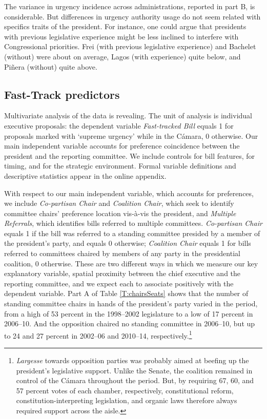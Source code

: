 \documentclass[letter,12pt]{article}
\begin{document}
The variance in urgency incidence across administrations, reported in part B, is considerable. But differences in urgency authority usage do not seem related with specifics traits of the president. For instance, one could argue that presidents with previous legislative experience might be less inclined to interfere with Congressional priorities. Frei (with previous legislative experience) and Bachelet (without) were about on average, Lagos (with experience) quite below, and Pi\~nera (without) quite above.

\subsection*{Fast-Track predictors}

Multivariate analysis of the data is revealing. The unit of analysis is individual executive proposals: the dependent variable \emph{Fast-tracked Bill} equals 1 for proposals marked with `supreme urgency' while in the C\'amara, 0 otherwise. Our main independent variable accounts for preference coincidence between the president and the reporting committee. We include controls for bill features, for timing, and for the strategic environment. Formal variable definitions and descriptive statistics appear in the online appendix.

With respect to our main independent variable, which accounts for preferences, we include \emph{Co-partisan Chair} and \emph{Coalition Chair}, which seek to identify committee chairs' preference location vis-\`a-vis the president, and \emph{Multiple Referrals}, which identifies bills referred to multiple committees. \emph{Co-partisan Chair} equals 1 if the bill was referred to a standing committee presided by a member of the president's party, and equals 0 otherwise; \emph{Coalition Chair} equals 1 for bills referred to committees chaired by members of any party in the presidential coalition, 0 otherwise. These are two different ways in which we measure our key explanatory variable, spatial proximity between the chief executive and the reporting committee, and we expect each to associate positively with the dependent variable. Part A of Table \ref{T:chairsSeats} shows that the number of standing committee chairs in hands of the president's party varied in the period, from a high of 53 percent in the 1998--2002 legislature to a low of 17 percent in 2006--10. And the opposition chaired no standing committee in 2006--10, but up to 24 and 27 percent in 2002--06 and 2010--14, respectively.\footnote{\emph{Largesse} towards opposition parties was probably aimed at beefing up the president's legislative support. Unlike the Senate, the coalition remained in control of the C\'amara throughout the period. But, by requiring 67, 60, and 57 percent votes of each chamber, respectively, constitutional reform, constitution-interpreting legislation, and organic laws therefore always required support across the aisle.}
\end{document}
